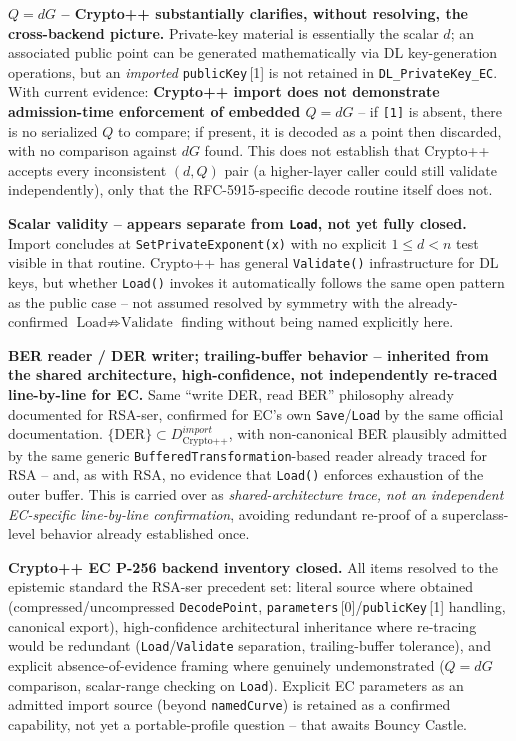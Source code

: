 \documentclass[11pt,a4paper]{article}
\begin{document}
\textbf{$Q=dG$ -- Crypto++ substantially clarifies, without resolving, the cross-backend picture.} Private-key material is essentially the scalar $d$; an associated public point can be generated mathematically via DL key-generation operations, but an \emph{imported} \texttt{publicKey}\,[1] is not retained in \texttt{DL\_PrivateKey\_EC}. With current evidence: \textbf{Crypto++ import does not demonstrate admission-time enforcement of embedded $Q=dG$} -- if \texttt{[1]} is absent, there is no serialized $Q$ to compare; if present, it is decoded as a point then discarded, with no comparison against $dG$ found. This does not establish that Crypto++ accepts every inconsistent $(d,Q)$ pair (a higher-layer caller could still validate independently), only that the RFC-5915-specific decode routine itself does not.

\textbf{Scalar validity -- appears separate from \texttt{Load}, not yet fully closed.} Import concludes at \texttt{SetPrivateExponent(x)} with no explicit $1\le d<n$ test visible in that routine. Crypto++ has general \texttt{Validate()} infrastructure for DL keys, but whether \texttt{Load()} invokes it automatically follows the same open pattern as the public case -- not assumed resolved by symmetry with the already-confirmed $\text{Load}\not\Rightarrow\text{Validate}$ finding without being named explicitly here.

\textbf{BER reader / DER writer; trailing-buffer behavior -- inherited from the shared architecture, high-confidence, not independently re-traced line-by-line for EC.} Same ``write DER, read BER'' philosophy already documented for RSA-ser, confirmed for EC's own \texttt{Save}/\texttt{Load} by the same official documentation. $\{\text{DER}\}\subset D_{\text{Crypto++}}^{import}$, with non-canonical BER plausibly admitted by the same generic \texttt{BufferedTransformation}-based reader already traced for RSA -- and, as with RSA, no evidence that \texttt{Load()} enforces exhaustion of the outer buffer. This is carried over as \emph{shared-architecture trace, not an independent EC-specific line-by-line confirmation}, avoiding redundant re-proof of a superclass-level behavior already established once.

\textbf{Crypto++ EC P-256 backend inventory closed.} All items resolved to the epistemic standard the RSA-ser precedent set: literal source where obtained (compressed/uncompressed \texttt{DecodePoint}, \texttt{parameters}\,[0]/\texttt{publicKey}\,[1] handling, canonical export), high-confidence architectural inheritance where re-tracing would be redundant (\texttt{Load}/\texttt{Validate} separation, trailing-buffer tolerance), and explicit absence-of-evidence framing where genuinely undemonstrated ($Q=dG$ comparison, scalar-range checking on \texttt{Load}). Explicit EC parameters as an admitted import source (beyond \texttt{namedCurve}) is retained as a confirmed capability, not yet a portable-profile question -- that awaits Bouncy Castle.
\end{document}
